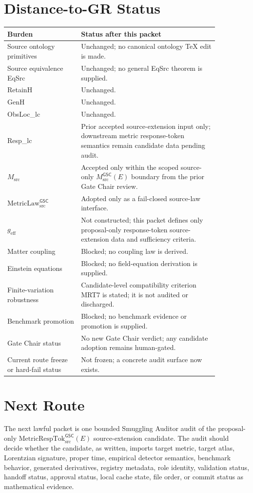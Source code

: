 \documentclass[11pt]{article}
\newcommand{\Msrc}{M_{\mathrm{src}}}
\newcommand{\MsrcGSC}{M_{\mathrm{src}}^{\mathsf{GSC}}}
\newcommand{\MetricLaw}{\mathrm{MetricLaw}_{\mathrm{src}}^{\mathsf{GSC}}}
\newcommand{\MetricRespTok}{\mathrm{MetricRespTok}_{\mathrm{src}}^{\mathsf{GSC}}}
\newcommand{\geff}{g_{\mathrm{eff}}}
\begin{document}
\section{Distance-to-GR Status}

\begin{longtable}{p{0.30\linewidth}p{0.56\linewidth}}
\toprule
Burden & Status after this packet \\
\midrule
Source ontology primitives & Unchanged; no canonical ontology TeX edit is made. \\
Source equivalence EqSrc & Unchanged; no general EqSrc theorem is supplied. \\
RetainH & Unchanged. \\
GenH & Unchanged. \\
ObsLoc\_lc & Unchanged. \\
Resp\_lc & Prior accepted source-extension input only; downstream metric
response-token semantics remain candidate data pending audit. \\
\(\Msrc\) & Accepted only within the scoped source-only \(\MsrcGSC(E)\)
boundary from the prior Gate Chair review. \\
\(\MetricLaw\) & Adopted only as a fail-closed source-law interface. \\
\(\geff\) & Not constructed; this packet defines only proposal-only
response-token source-extension data and sufficiency criteria. \\
Matter coupling & Blocked; no coupling law is derived. \\
Einstein equations & Blocked; no field-equation derivation is supplied. \\
Finite-variation robustness & Candidate-level compatibility criterion MRT7
is stated; it is not audited or discharged. \\
Benchmark promotion & Blocked; no benchmark evidence or promotion is supplied. \\
Gate Chair status & No new Gate Chair verdict; any candidate adoption remains
human-gated. \\
Current route freeze or hard-fail status & Not frozen; a concrete audit
surface now exists. \\
\bottomrule
\end{longtable}

\section{Next Route}

The next lawful packet is one bounded Smuggling Auditor audit of the
proposal-only \(\MetricRespTok(E)\) source-extension candidate. The audit
should decide whether the candidate, as written, imports target metric,
target atlas, Lorentzian signature, proper time, empirical detector semantics,
benchmark behavior, generated derivatives, registry metadata, role identity,
validation status, handoff status, approval status, local cache state, file
order, or commit status as mathematical evidence.
\end{document}
